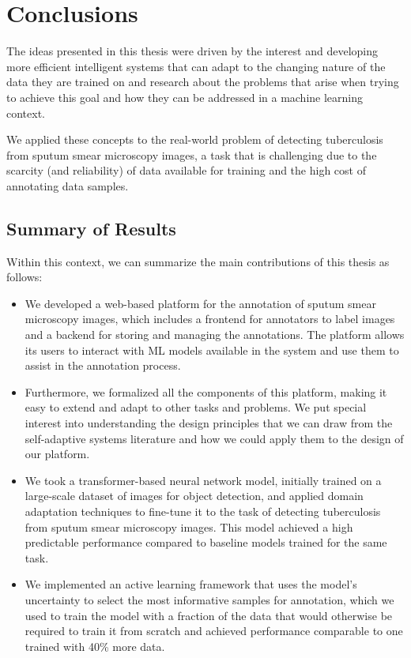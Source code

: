 \documentclass[../main.tex]{subfiles}
\begin{document}
\chapter{Conclusions} \label{chap:conclusions} 

    \vspace{-0.2cm}


    The ideas presented in this thesis were driven by the interest and developing more efficient intelligent systems that can adapt to the changing nature of the data they are trained on and research about the problems that arise when trying to achieve this goal and how they can be addressed in a machine learning context.
    
    We applied these concepts to the real-world problem of detecting tuberculosis from sputum smear microscopy images, a task that is challenging due to the scarcity (and reliability) of data available for training and the high cost of annotating data samples. 
    
    \vspace{-0.3cm}
    \section{Summary of Results} \label{conclusions:summary}
    \vspace{-0.3cm}

    Within this context, we can summarize the main contributions of this thesis as follows:
    \vspace{-0.1cm}

    \begin{itemize}
        \item We developed a web-based platform for the annotation of sputum smear microscopy images, which includes a frontend for annotators to label images and a backend for storing and managing the annotations. The platform allows its users to interact with ML models available in the system and use them to assist in the annotation process.
        \item Furthermore, we formalized all the components of this platform, making it easy to extend and adapt to other tasks and problems. We put special interest into understanding the design principles that we can draw from the self-adaptive systems literature and how we could apply them to the design of our platform.
        \item We took a transformer-based neural network model, initially trained on a large-scale dataset of images for object detection, and applied domain adaptation techniques to fine-tune it to the task of detecting tuberculosis from sputum smear microscopy images. This model achieved a high predictable performance compared to baseline models trained for the same task.
        \item We implemented an active learning framework that uses the model's uncertainty to select the most informative samples for annotation, which we used to train the model with a fraction of the data that would otherwise be required to train it from scratch and achieved performance comparable to one trained with 40\% more data.
    \end{itemize}
\end{document}
